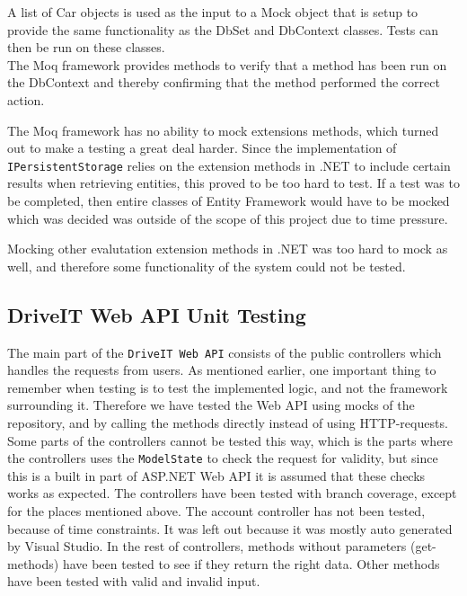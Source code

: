 A list of Car objects is used as the input to a Mock object that is setup to provide the same functionality as the DbSet and DbContext classes. Tests can then be run on these classes.\\
The Moq framework provides methods to verify that a method has been run on the DbContext and thereby confirming that the method performed the correct action. 

The Moq framework has no ability to mock extensions methods, which turned out to make a testing a great deal harder. Since the implementation of \texttt{IPersistentStorage} relies on the extension methods in .NET to include certain results when retrieving entities, this proved to be too hard to test. If a test was to be completed, then entire classes of Entity Framework would have to be mocked which was decided was outside of the scope of this project due to time pressure.

Mocking other evalutation extension methods in .NET was too hard to mock as well, and therefore some functionality of the system could not be tested.

\subsection{DriveIT Web API Unit Testing}
The main part of the \texttt{DriveIT Web API} consists of the public controllers which handles the requests from users. As mentioned earlier, one important thing to remember when testing is to test the implemented logic, and not the framework surrounding it. Therefore we have tested the Web API using mocks of the repository, and by calling the methods directly instead of using HTTP-requests.
Some parts of the controllers cannot be tested this way, which is the parts where the controllers uses the \texttt{ModelState} to check the request for validity, but since this is a built in part of ASP.NET Web API it is assumed that these checks works as expected.
The controllers have been tested with branch coverage, except for the places mentioned above.
The account controller has not been tested, because of time constraints. It was left out because it was mostly auto generated by Visual Studio. 
In the rest of controllers, methods without parameters (get-methods) have been tested to see if they return the right data. Other methods have been tested with valid and invalid input.